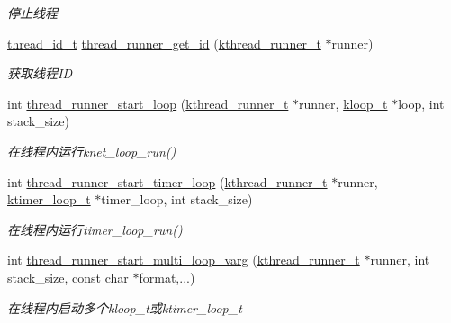 \begin{DoxyCompactItemize}
\begin{DoxyCompactList}\small\item\em 停止线程 \end{DoxyCompactList}\item 
\hyperlink{a00054_ad0ada5642d10ce71bdd90816182f9b79_ad0ada5642d10ce71bdd90816182f9b79}{thread\+\_\+id\+\_\+t} \hyperlink{a00117_ga1f1e994ba4c42e91e4d4b120aa8eb970_ga1f1e994ba4c42e91e4d4b120aa8eb970}{thread\+\_\+runner\+\_\+get\+\_\+id} (\hyperlink{a00054_a4f78c259c9527c821f1a6f87495dd339_a4f78c259c9527c821f1a6f87495dd339}{kthread\+\_\+runner\+\_\+t} $\ast$runner)
\begin{DoxyCompactList}\small\item\em 获取线程\+I\+D \end{DoxyCompactList}\item 
int \hyperlink{a00117_ga4328cb11f2446f4da89374a1ae8a2f8e_ga4328cb11f2446f4da89374a1ae8a2f8e}{thread\+\_\+runner\+\_\+start\+\_\+loop} (\hyperlink{a00054_a4f78c259c9527c821f1a6f87495dd339_a4f78c259c9527c821f1a6f87495dd339}{kthread\+\_\+runner\+\_\+t} $\ast$runner, \hyperlink{a00054_a97fc76209a58362019f1ded9169e397f_a97fc76209a58362019f1ded9169e397f}{kloop\+\_\+t} $\ast$loop, int stack\+\_\+size)
\begin{DoxyCompactList}\small\item\em 在线程内运行knet\+\_\+loop\+\_\+run() \end{DoxyCompactList}\item 
int \hyperlink{a00117_ga943c1e0bc78abe3d7faae24ae3670d9a_ga943c1e0bc78abe3d7faae24ae3670d9a}{thread\+\_\+runner\+\_\+start\+\_\+timer\+\_\+loop} (\hyperlink{a00054_a4f78c259c9527c821f1a6f87495dd339_a4f78c259c9527c821f1a6f87495dd339}{kthread\+\_\+runner\+\_\+t} $\ast$runner, \hyperlink{a00054_a024af2aa29615e7a811ea6c45438157d_a024af2aa29615e7a811ea6c45438157d}{ktimer\+\_\+loop\+\_\+t} $\ast$timer\+\_\+loop, int stack\+\_\+size)
\begin{DoxyCompactList}\small\item\em 在线程内运行timer\+\_\+loop\+\_\+run() \end{DoxyCompactList}\item 
int \hyperlink{a00117_ga80fabbe64d1fc33e81053e51f69772d2_ga80fabbe64d1fc33e81053e51f69772d2}{thread\+\_\+runner\+\_\+start\+\_\+multi\+\_\+loop\+\_\+varg} (\hyperlink{a00054_a4f78c259c9527c821f1a6f87495dd339_a4f78c259c9527c821f1a6f87495dd339}{kthread\+\_\+runner\+\_\+t} $\ast$runner, int stack\+\_\+size, const char $\ast$format,...)
\begin{DoxyCompactList}\small\item\em 在线程内启动多个kloop\+\_\+t或ktimer\+\_\+loop\+\_\+t \end{DoxyCompactList}\item 

\end{DoxyCompactItemize}

